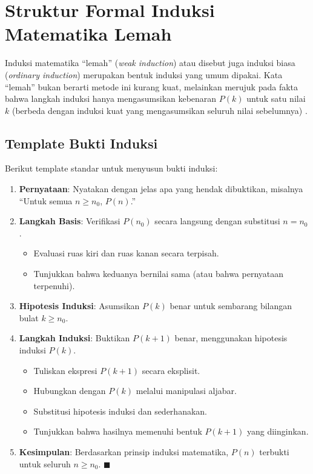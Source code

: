 \section{Struktur Formal Induksi Matematika Lemah}

Induksi matematika ``lemah'' (\textit{weak induction}) atau disebut juga induksi biasa (\textit{ordinary induction}) merupakan bentuk induksi yang umum dipakai. Kata ``lemah'' bukan berarti metode ini kurang kuat, melainkan merujuk pada fakta bahwa langkah induksi hanya mengasumsikan kebenaran $P(k)$ untuk satu nilai $k$ (berbeda dengan induksi kuat yang mengasumsikan seluruh nilai sebelumnya) \cite{rosen2019}.

\subsection{Template Bukti Induksi}

Berikut template standar untuk menyusun bukti induksi:

\begin{enumerate}
    \item \textbf{Pernyataan}: Nyatakan dengan jelas apa yang hendak dibuktikan, misalnya ``Untuk semua $n \geq n_0$, $P(n)$.''

    \item \textbf{Langkah Basis}: Verifikasi $P(n_0)$ secara langsung dengan substitusi $n = n_0$.
    \begin{itemize}
        \item Evaluasi ruas kiri dan ruas kanan secara terpisah.
        \item Tunjukkan bahwa keduanya bernilai sama (atau bahwa pernyataan terpenuhi).
    \end{itemize}

    \item \textbf{Hipotesis Induksi}: Asumsikan $P(k)$ benar untuk sembarang bilangan bulat $k \geq n_0$.

    \item \textbf{Langkah Induksi}: Buktikan $P(k+1)$ benar, menggunakan hipotesis induksi $P(k)$.
    \begin{itemize}
        \item Tuliskan ekspresi $P(k+1)$ secara eksplisit.
        \item Hubungkan dengan $P(k)$ melalui manipulasi aljabar.
        \item Substitusi hipotesis induksi dan sederhanakan.
        \item Tunjukkan bahwa hasilnya memenuhi bentuk $P(k+1)$ yang diinginkan.
    \end{itemize}

    \item \textbf{Kesimpulan}: Berdasarkan prinsip induksi matematika, $P(n)$ terbukti untuk seluruh $n \geq n_0$. $\blacksquare$
\end{enumerate}

